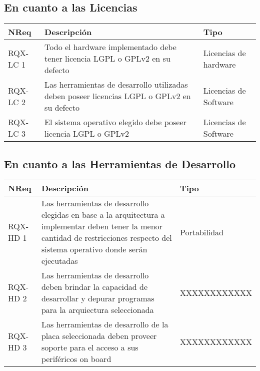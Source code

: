 		\subsection{En cuanto a las Licencias}
		\begin{tabular}{ p{2.5cm} p{8cm} p{3cm} }
		\hline 
		\rowcolor[gray]{0.8} N\textordmasculine Req & Descripción  & Tipo\\
		\hline 
		RQX-LC 1 &  Todo el hardware implementado debe tener licencia LGPL o GPLv2 en su defecto & Licencias de hardware\\
		\hline 
		RQX-LC 2 &  Las herramientas de desarrollo utilizadas deben poseer licencias LGPL o GPLv2 en su defecto & Licencias de Software\\
		\hline
		RQX-LC 3 & El sistema operativo elegido debe poseer licencia LGPL o GPLv2 & Licencias de Software\\
		\hline
		\end{tabular}
			
		\subsection{En cuanto a las Herramientas de Desarrollo}
		\begin{tabular}{ p{2.5cm} p{8cm} p{3cm} }
		\hline 
		\rowcolor[gray]{0.8} N\textordmasculine Req & Descripción  & Tipo\\
		\hline 
		RQX-HD 1 &  Las herramientas de desarrollo elegidas en base a la arquitectura a implementar deben tener la menor cantidad de restricciones respecto
		del sistema operativo donde serán ejecutadas & Portabilidad\\
		\hline 
		RQX-HD 2 &  Las herramientas de desarrollo deben brindar la capacidad de desarrollar y depurar programas para la arquiectura seleccionada &
		XXXXXXXXXXXX\\ %
		\hline
		RQX-HD 3 &  Las herramientas de desarrollo de la placa seleccionada deben proveer soporte para el acceso a sus periféricos on board &
		XXXXXXXXXXXX\\ %
		\hline 
		\end{tabular}
		
